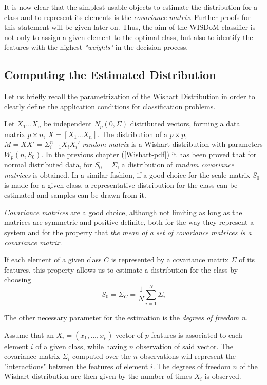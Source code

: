 \documentclass[12pt,openright,twoside,a4paper]{book}
\begin{document}
It is now clear that the simplest usable objects to estimate the distribution for a class and to represent its elements is the \textit{covariance  matrix}. Further proofs for this statement will be given later on.
Thus, the aim of the WISDoM classifier is not only to assign a given element to the optimal class, but also to identify the features with the highest \textit{"weights"} in the decision process.

\subsection{Computing the Estimated Distribution}

Let us briefly recall the parametrization of the Wishart Distribution in order to clearly define the application conditions for classification problems.

Let $X_1...X_n$ be independent $N_p(0,\Sigma)$ distributed vectors, forming a data matrix $p\times n$, $X=[X_1...X_n]$.
The distribution of  a $p\times p$, $M=XX'=\Sigma^n_{i=1}X_iX_i'$ \textit{random matrix}  is a Wishart distribution with parameters $W_p (n, S_0 )$. In the previous chapter (\ref{Wishart-pdf}) it has been proved that for normal distributed data, for $S_0=\Sigma$, a distribution of \textit{random covariance matrices} is obtained.
In a similar fashion, if a good choice for the scale matrix $S_0$ is made for a given class, a representative distribution for the class can be estimated and samples can be drawn from it.

\textit{Covariance matrices} are a good choice, although not limiting as long as the matrices are symmetric and positive-definite, both for the way they represent a system and for the property that \textit{the mean of a set of covariance matrices is a covariance matrix}. 

If each element of a given class $C$ is represented by a covariance matrix $\Sigma$ of its features, this property allows us to estimate a distribution for the class by choosing 
\begin{equation}
S_0=\hat{\Sigma}_C=\frac{1}{N}\sum_{i=1}^N \Sigma_i
\label{Class-Scale}
\end{equation}


The other necessary parameter for the estimation is the \textit{degrees of freedom n}.

Assume that an $X_i=(x_1, ..., x_p)$ vector of $p$ features is associated to each element $i$ of a given class, while having $n$ observation of said vector. The covariance matrix $\Sigma_i$ computed over the $n$ observations will represent the "interactions" between the features of element $i$.
The degrees of freedom  $n$ of the Wishart distribution are then given by the number of times $X_i$ is observed.
\end{document}
